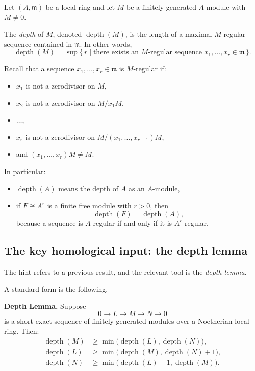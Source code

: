 \documentclass[12pt,a4paper]{article}
\theoremstyle{notespace}
\begin{document}
Let \((A,\mathfrak m)\) be a local ring and let \(M\) be a finitely generated \(A\)-module with \(M\neq 0\).

The \emph{depth} of \(M\), denoted \(\operatorname{depth}(M)\), is the length of a maximal \(M\)-regular sequence contained in \(\mathfrak m\). In other words,
\[
\operatorname{depth}(M)=\sup\bigl\{\, r \mid \text{there exists an \(M\)-regular sequence } x_1,\dots,x_r\in \mathfrak m \,\bigr\}.
\]

Recall that a sequence \(x_1,\dots,x_r\in \mathfrak m\) is \(M\)-regular if:
\begin{itemize}
	\item \(x_1\) is not a zerodivisor on \(M\),
	\item \(x_2\) is not a zerodivisor on \(M/x_1M\),
	\item \(\dots\),
	\item \(x_r\) is not a zerodivisor on \(M/(x_1,\dots,x_{r-1})M\),
	\item and \((x_1,\dots,x_r)M\neq M\).
\end{itemize}

In particular:
\begin{itemize}
	\item \(\operatorname{depth}(A)\) means the depth of \(A\) as an \(A\)-module,
	\item if \(F\cong A^r\) is a finite free module with \(r>0\), then
	\[
	\operatorname{depth}(F)=\operatorname{depth}(A),
	\]
	because a sequence is \(A\)-regular if and only if it is \(A^r\)-regular.
\end{itemize}

\subsection{The key homological input: the depth lemma}

The hint refers to a previous result, and the relevant tool is the \emph{depth lemma}.

A standard form is the following.

\medskip

\textbf{Depth Lemma.}
Suppose
\[
0 \longrightarrow L \longrightarrow M \longrightarrow N \longrightarrow 0
\]
is a short exact sequence of finitely generated modules over a Noetherian local ring. Then:
\begin{align*}
	\operatorname{depth}(M) &\ge \min\bigl(\operatorname{depth}(L),\operatorname{depth}(N)\bigr),\\[4pt]
	\operatorname{depth}(L) &\ge \min\bigl(\operatorname{depth}(M),\operatorname{depth}(N)+1\bigr),\\[4pt]
	\operatorname{depth}(N) &\ge \min\bigl(\operatorname{depth}(L)-1,\operatorname{depth}(M)\bigr).
\end{align*}
\end{document}
